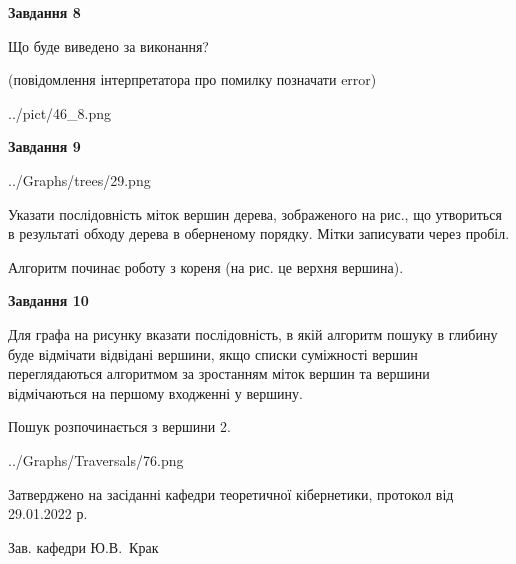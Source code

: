 \documentclass[12pt, ukrainian]{article}
\begin{document}
{\begin {large}
{\begin {center}\textbf{Завдання 8}\end {center}}\par
Що буде виведено за виконання?\par
 (повідомлення інтерпретатора про помилку позначати error)\par
\begin{center}
	{../pict/46_8.png}
\end{center}
\newpage

{\begin {center}\textbf{Завдання 9}\end {center}}\par

\begin{center}
	{../Graphs/trees/29.png}
\end{center}
Указати послідовність міток вершин дерева, зображеного на рис., що утвориться в результаті обходу дерева в оберненому порядку. Мітки записувати через пробіл.\par Алгоритм починає роботу з кореня (на рис. це верхня вершина).\par
\newpage

{\begin {center}\textbf{Завдання 10}\end {center}}\par
Для графа на рисунку вказати послідовність, в якій алгоритм пошуку в глибину буде відмічати відвідані вершини, якщо списки суміжності вершин переглядаються алгоритмом за зростанням міток вершин та вершини відмічаються на першому вход\-женні у вершину.\par
Пошук розпочинається з вершини 2.\par

\begin{center}
	{../Graphs/Traversals/76.png}
\end{center}\par
\newpage


\end {large}
}
{\smallskip \begin {small} Затверджено на засіданні кафедри теоретичної кібернетики, протокол  від   29.01.2022 р.\par\smallskip\smallskip
{\parbox {6.5 cm}{Зав. кафедри \dotfill Ю.В.~Крак}} \end{small}}
\end{document}
